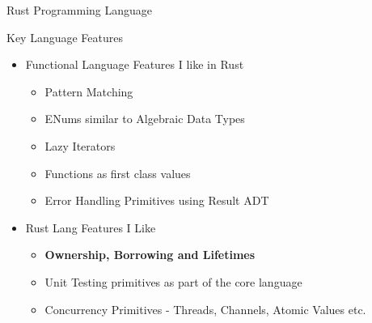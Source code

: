 \begin{section}{Rust Programming Language}
  \begin{frame}{Key Language Features}
    \begin{itemize}
    \item Functional Language Features I like in Rust
    \begin{itemize}
    \item Pattern Matching
    \item ENums similar to Algebraic Data Types
    \item Lazy Iterators
    \item Functions as first class values
    \item Error Handling Primitives using Result ADT
    \end{itemize}
    \item Rust Lang Features I Like
    \begin{itemize}
    \item \textbf{Ownership, Borrowing and Lifetimes}
    \item Unit Testing primitives as part of the core language
    \item Concurrency Primitives - Threads, Channels, Atomic Values etc.
    \end{itemize}
    \end{itemize}
  \end{frame}
\end{section}
